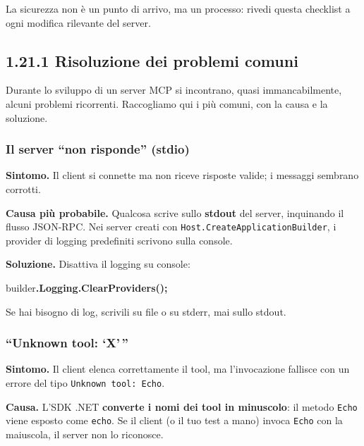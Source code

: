 \documentclass[
  italian,
  10pt,
]{book}
\newenvironment{Shaded}{\begin{snugshade}}{\end{snugshade}}
\newcommand{\FunctionTok}[1]{\textcolor[rgb]{0.13,0.29,0.53}{\textbf{#1}}}
\newcommand{\NormalTok}[1]{#1}
\newcommand{\OperatorTok}[1]{\textcolor[rgb]{0.81,0.36,0.00}{\textbf{#1}}}
\begin{document}
La sicurezza non è un punto di arrivo, ma un processo: rivedi questa
checklist a ogni modifica rilevante del server.

\subsection{1.21.1 Risoluzione dei problemi
comuni}\label{risoluzione-dei-problemi-comuni}

Durante lo sviluppo di un server MCP si incontrano, quasi
immancabilmente, alcuni problemi ricorrenti. Raccogliamo qui i più
comuni, con la causa e la soluzione.

\subsubsection{Il server ``non risponde''
(stdio)}\label{il-server-non-risponde-stdio}

\textbf{Sintomo.} Il client si connette ma non riceve risposte valide; i
messaggi sembrano corrotti.

\textbf{Causa più probabile.} Qualcosa scrive sullo \textbf{stdout} del
server, inquinando il flusso JSON-RPC. Nei server creati con
\texttt{Host.CreateApplicationBuilder}, i provider di logging
predefiniti scrivono sulla console.

\textbf{Soluzione.} Disattiva il logging su console:

\begin{Shaded}
\begin{Highlighting}[]
\NormalTok{builder}\OperatorTok{.}\FunctionTok{Logging}\OperatorTok{.}\FunctionTok{ClearProviders}\OperatorTok{();}
\end{Highlighting}
\end{Shaded}

Se hai bisogno di log, scrivili su file o su stderr, mai sullo stdout.

\subsubsection{``Unknown tool: `X'\,''}\label{unknown-tool-x}

\textbf{Sintomo.} Il client elenca correttamente il tool, ma
l'invocazione fallisce con un errore del tipo
\texttt{Unknown\ tool:\ \textquotesingle{}Echo\textquotesingle{}}.

\textbf{Causa.} L'SDK .NET \textbf{converte i nomi dei tool in
minuscolo}: il metodo \texttt{Echo} viene esposto come \texttt{echo}. Se
il client (o il tuo test a mano) invoca \texttt{Echo} con la maiuscola,
il server non lo riconosce.
\end{document}
